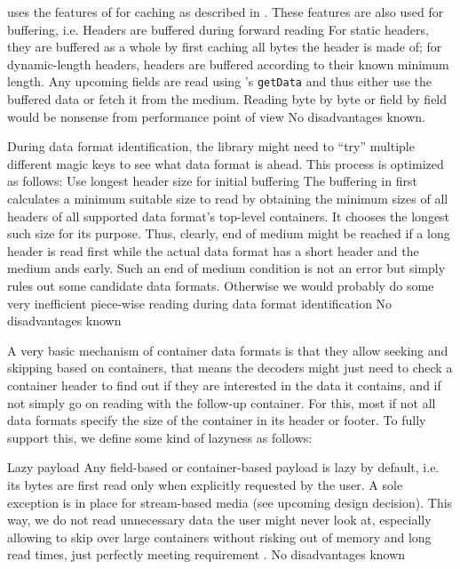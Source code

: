 \COMPdataPartManagement{} uses the features of \COMPmedia{} for caching as described in . These features are also used for buffering, i.e.
{%
Headers are buffered during forward reading
}
{%
For static headers, they are buffered as a whole by first caching all bytes the header is made of; for dynamic-length headers, headers are buffered according to their known minimum length. Any upcoming fields are read using \COMPmedia{}'s \texttt{getData} and thus either use the buffered data or fetch it from the medium.
}
{%
Reading byte by byte or field by field would be nonsense from performance point of view
}
{%
No disadvantages known.
}

During data format identification, the library might need to ``try'' multiple different magic keys to see what data format is ahead. This process is optimized as follows:
{%
Use longest header size for initial buffering
}
{%
The buffering in  first calculates a minimum suitable size to read by obtaining the minimum sizes of all headers of all supported data format's top-level containers. It chooses the longest such size for its purpose. Thus, clearly, end of medium might be reached if a long header is read first while the actual data format has a short header and the medium ands early. Such an end of medium condition is not an error but simply rules out some candidate data formats.
}
{%
Otherwise we would probably do some very inefficient piece-wise reading during data format identification
}
{%
No disadvantages known
}

A very basic mechanism of container data formats is that they allow seeking and skipping based on containers, that means the decoders might just need to check a container header to find out if they are interested in the data it contains, and if not simply go on reading with the follow-up container. For this, most if not all data formats specify the size of the container in its header or footer. To fully support this, we define some kind of lazyness as follows:

{%
Lazy payload
}
{%
Any field-based or container-based payload is lazy by default, i.e. its bytes are first read only when explicitly requested by the user. A sole exception is in place for stream-based media (see upcoming design decision). 
}
{%
This way, we do not read unnecessary data the user might never look at, especially allowing to skip over large containers without risking out of memory and long read times, just perfectly meeting requirement .
}
{%
No disadvantages known
}

